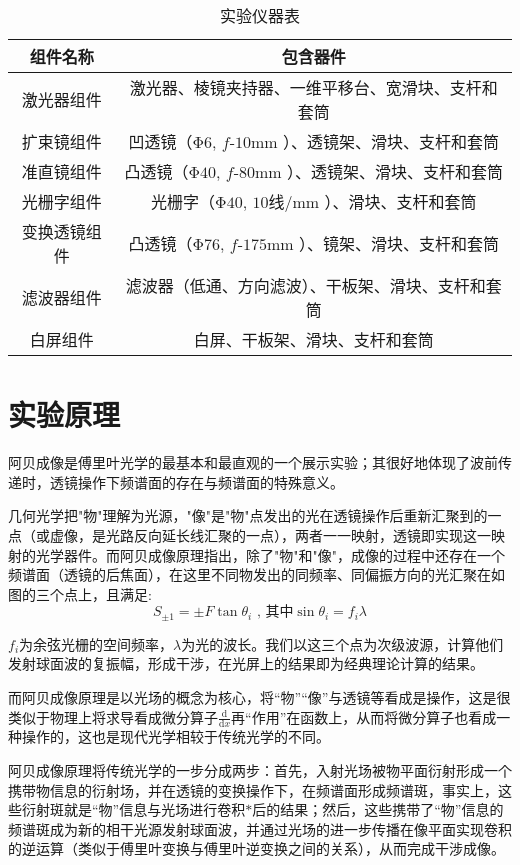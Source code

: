 \documentclass[11pt]{article}
\begin{document}
\begin{table}[H]
    \centering
    \begin{tabular}{|c|c|}\hline
        组件名称 & 包含器件\\ \hline
        激光器组件& 激光器、棱镜夹持器、一维平移台、宽滑块、支杆和套筒\\ \hline
        扩束镜组件& 凹透镜（Φ$ 6$, $f$-$10$mm ）、透镜架、滑块、支杆和套筒\\ \hline
        准直镜组件& 凸透镜（Φ$40$, $f$-$80$mm ）、透镜架、滑块、支杆和套筒\\ \hline
        光栅字组件& 光栅字（Φ$40$, $10$线/mm ）、滑块、支杆和套筒\\ \hline
        变换透镜组件& 凸透镜（Φ$76$, $f$-$175$mm ）、镜架、滑块、支杆和套筒\\ \hline
        滤波器组件& 滤波器（低通、方向滤波）、干板架、滑块、支杆和套筒\\ \hline
        白屏组件& 白屏、干板架、滑块、支杆和套筒\\ \hline
    \end{tabular}
    \caption{实验仪器表}
\end{table}

\section{实验原理}

阿贝成像是傅里叶光学的最基本和最直观的一个展示实验；其很好地体现了波前传递时，透镜操作下频谱面的存在与频谱面的特殊意义。

几何光学把"物"理解为光源，"像"是"物"点发出的光在透镜操作后重新汇聚到的一点（或虚像，是光路反向延长线汇聚的一点），两者一一映射，透镜即实现这一映射的光学器件。而阿贝成像原理指出，除了"物"和"像"，成像的过程中还存在一个频谱面（透镜的后焦面），在这里不同物发出的同频率、同偏振方向的光汇聚在如图的三个点上，且满足:
\[
    S_{\pm 1} = \pm F\tan{\theta_i}\text{ , 其中}\sin{\theta_i} = f_i\lambda
\]

$f_i$为余弦光栅的空间频率，$\lambda$为光的波长。我们以这三个点为次级波源，计算他们发射球面波的复振幅，形成干涉，在光屏上的结果即为经典理论计算的结果。

而阿贝成像原理是以光场的概念为核心，将“物”“像”与透镜等看成是操作，这是很类似于物理上将求导看成微分算子$\displaystyle \frac{\mathrm{d}}{\mathrm{d}x}$再“作用”在函数上，从而将微分算子也看成一种操作的，这也是现代光学相较于传统光学的不同。

阿贝成像原理将传统光学的一步分成两步：首先，入射光场被物平面衍射形成一个携带物信息的衍射场，并在透镜的变换操作下，在频谱面形成频谱斑，事实上，这些衍射斑就是“物”信息与光场进行卷积$*$后的结果；然后，这些携带了“物”信息的频谱斑成为新的相干光源发射球面波，并通过光场的进一步传播在像平面实现卷积的逆运算（类似于傅里叶变换与傅里叶逆变换之间的关系），从而完成干涉成像。
\end{document}
